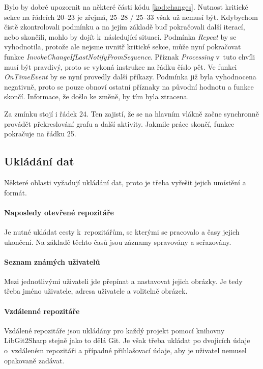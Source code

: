 \documentclass[
  biblatex,
  glossaries,
  index
]{kidiplom}
\begin{document}
Bylo by dobré upozornit na některé části kódu \ref{kod:changes}. Nutnost kritické sekce na řádcích 20--23 je zřejmá, 25--28 / 25--33 však už nemusí být. Kdybychom čistě zkontrolovali podmínku a na jejím základě buď pokračovali další iterací, nebo skončili, mohlo by dojít k~následující situaci. Podmínka {\it Repeat} by se vyhodnotila, protože ale nejsme uvnitř kritické sekce, může nyní pokračovat funkce {\it InvokeChangeIfLastNotifyFromSequence}. Příznak {\it Processing} v~tuto chvíli musí být pravdivý, proto se vykoná instrukce na řádku číslo pět. Ve funkci {\it OnTimeEvent} by se nyní provedly další příkazy. Podmínka již byla vyhodnocena negativně, proto se pouze obnoví ostatní příznaky na původní hodnotu a funkce skončí. Informace, že došlo ke změně, by tím byla ztracena.

Za zmínku stojí i řádek 24. Ten zajistí, že se na hlavním vlákně začne synchronně provádět překreslování grafu a další aktivity. Jakmile práce skončí, funkce pokračuje na řádku 25.

\subsection{Ukládání dat}
Některé oblasti vyžadují ukládání dat, proto je třeba vyřešit jejich umístění a formát.

\paragraph*{Naposledy otevřené repozitáře}
Je nutné ukládat cesty k~repozitářům, se kterými se pracovalo a časy jejich ukončení. Na základě těchto časů jsou záznamy spravovány a seřazovány.

\paragraph*{Seznam známých uživatelů}
Mezi jednotlivými uživateli jde přepínat a nastavovat jejich obrázky. Je tedy třeba jméno uživatele, adresa uživatele a volitelně obrázek.

\paragraph*{Vzdálenné repozitáře}
Vzdálené repozitáře jsou ukládány pro každý projekt pomocí knihovny LibGit2Sharp stejně jako to dělá Git. Je však třeba ukládat po dvojicích údaje o~vzdáleném repozitáři a případné přihlašovací údaje, aby je uživatel nemusel opakovaně zadávat.
\end{document}
